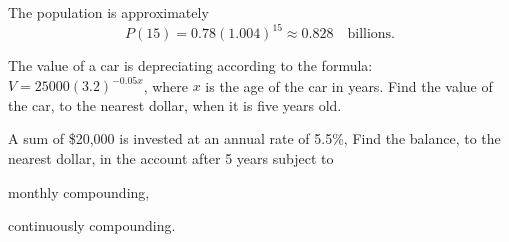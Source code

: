	\begin{solution}
		The population is approximately
		\[
		P(15)=0.78(1.004)^{15}\approx 0.828 \quad \text{billions}.
		\]
	\end{solution}

\newpage

\begin{exercise}
	The value of a car is depreciating according to the formula: $V=25000(3.2)^{-0.05x}$, 
	where $x$ is the age of the car in years. 
	Find the value of the car, to the nearest dollar, when it is five years old.
\end{exercise}


\vfill
\begin{center} \hfill
	\raisebox{0.4em}{
		\rotatebox{\rotationdegree}{
			\parbox{\textwidth}{
				\begin{enumerate*}[label={\theexer~}]
					\item \$18692 \hfill\null
				\end{enumerate*}
			}
		}
	}
\end{center}



\begin{exercise}
	A sum of \$20,000 is invested at an annual rate of 5.5\%, Find the balance, to the nearest dollar, 
	in the account after 5 years subject to\\
	\begin{enumerate*}[label={(\arabic*)~}]
		\item monthly compounding,
		\item continuously compounding.
		\hfill\null
	\end{enumerate*}
\end{exercise}

\vfill
\begin{center} \hfill
	\raisebox{0.4em}{
		\rotatebox{\rotationdegree}{
			\parbox{\textwidth}{
				\begin{enumerate*}[label={\theexer~(\arabic*)~}]
					\item \$26314
					\item \$26331
					\hfill\null
				\end{enumerate*}
			}
		}
	}
\end{center}


\newpage


